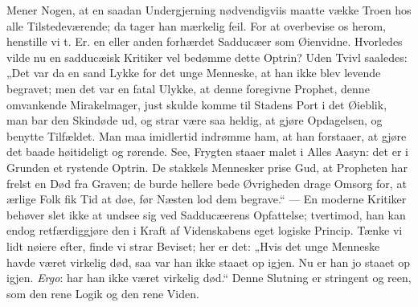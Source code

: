 \documentclass[12pt,a4paper]{book}
\begin{document}
Mener Nogen, at en saadan Undergjerning nødvendigviis maatte vække Troen hos alle
Tilstedeværende; da tager han mærkelig feil. For at overbevise os herom, henstille vi
t. Er. en eller anden forhærdet Sadducæer som Øienvidne. Hvorledes vilde nu en
sadducæisk Kritiker vel bedømme dette Optrin? Uden Tvivl saaledes: „Det var da en sand
Lykke for det unge Menneske, at han ikke blev levende begravet; men det var en fatal
Ulykke, at denne foregivne Prophet, denne omvankende Mirakelmager, just skulde komme
til Stadens Port i det Øieblik, man bar den Skindøde ud, og strar være saa heldig, at
gjøre Opdagelsen, og benytte Tilfældet. Man maa imidlertid indrømme ham, at han
forstaaer, at gjøre det baade høitideligt og rørende. See, Frygten staaer
malet i Alles Aasyn: det er i Grunden et rystende Optrin. De stakkels Mennesker prise
Gud, at Propheten har frelst en Død fra Graven; de burde hellere bede Øvrigheden drage
Omsorg for, at ærlige Folk fik Tid at døe, før Næsten lod dem begrave.“ --- En moderne
Kritiker behøver slet ikke at undsee sig ved Sadducæerens Opfattelse; tvertimod, han
kan endog retfærdiggjøre den i Kraft af Videnskabens eget logiske Princip. Tænke vi
lidt nøiere efter, finde vi strar Beviset; her er det: „Hvis det unge Menneske havde
været virkelig død, saa var han ikke staaet op igjen. Nu er han jo staaet op igjen.
\textit{Ergo}: har han ikke været virkelig død.“ Denne Slutning er stringent og reen,
som den rene Logik og den rene Viden.
\end{document}
